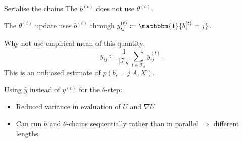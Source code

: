 \documentclass{beamer}
\newcommand{\Tcal}{\mathcal{T}}
\newcommand{\one}{\mathbbm{1}}
\begin{document}
	\begin{frame}{Serialise the chains}
		The $b^{(t)}$ does not use $\theta^{(t)}$.
		
		The $\theta^{(t)}$ update uses $b^{(t)}$ through $y^{(t)}_{ij} \coloneqq \one\{b^{(t)}_i = j\}$.
		
		Why not use empirical mean of this quantity:		
		$$\hat{y}_{ij} \coloneqq \frac{1}{|\Tcal_b|} \sum_{t \in \Tcal_b} y_{ij}^{(t)}.$$
		This is an unbiased estimate of $p(b_i=j|A,X)$.
		
		Using $\hat{y}$ instead of $y^{(t)}$ for the $\theta$-step:
		\begin{itemize}
			\item Reduced variance in evaluation of $U$ and $\nabla U$
			\item Can run $b$ and $\theta$-chains sequentially rather than in parallel $\Rightarrow$ different lengths.
		\end{itemize}
	\end{frame}
\end{document}
